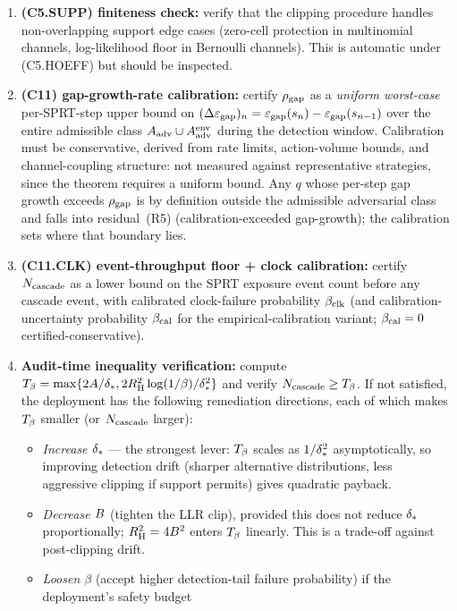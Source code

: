 \begin{enumerate}
  as the certified value.
\item \textbf{(C5.SUPP) finiteness check:} verify that the clipping
  procedure handles non-overlapping support edge cases (zero-cell
  protection in multinomial channels, log-likelihood floor in
  Bernoulli channels).  This is automatic under (C5.HOEFF) but
  should be inspected.
\item \textbf{(C11) gap-growth-rate calibration:} certify $\rho_{\mathrm{gap}}$ as a
    \emph{uniform worst-case} per-SPRT-step upper bound on $(\Delta\varepsilon_{\mathrm{gap}})_n =
    \varepsilon_{\mathrm{gap}}(s_n) - \varepsilon_{\mathrm{gap}}(s_{n-1})$ over the entire admissible class
    $A_{\mathrm{adv}} \cup A_{\mathrm{adv}}^{\mathrm{env}}$ during the detection window.
    Calibration must be conservative, derived from rate limits,
    action-volume bounds, and channel-coupling structure: not measured
    against representative strategies, since the theorem requires a uniform
    bound.  Any $q$ whose per-step gap growth exceeds $\rho_{\mathrm{gap}}$ is by
    definition outside the admissible adversarial class and falls into
    residual~(R5) (calibration-exceeded gap-growth); the calibration sets
    where that boundary lies.
\item \textbf{(C11.CLK) event-throughput floor + clock calibration:}
  certify $N_{\mathrm{cascade}}$ as a lower bound on the SPRT exposure event
  count before any cascade event, with calibrated clock-failure
  probability $\beta_{\mathrm{clk}}$ (and calibration-uncertainty probability
  $\beta_{\mathrm{cal}}$ for the empirical-calibration variant; $\beta_{\mathrm{cal}} = 0$
  certified-conservative).
\item \textbf{Audit-time inequality verification:} compute $T_{\beta}
  = \max\{2A/\delta_{*}, 2R_{\mathrm{H}}^2 \log(1/\beta)/\delta_{*}^2\}$ and
  verify $N_{\mathrm{cascade}} \geq T_{\beta}$.  If not satisfied, the deployment
  has the following remediation directions, each of which makes
  $T_{\beta}$ smaller (or $N_{\mathrm{cascade}}$ larger):
  \begin{itemize}
  \item \emph{Increase $\delta_{*}$} — the strongest lever:
    $T_{\beta}$ scales as $1/\delta_{*}^2$ asymptotically, so improving
    detection drift (sharper alternative distributions, less
    aggressive clipping if support permits) gives quadratic
    payback.
  \item \emph{Decrease $B$} (tighten the LLR clip), provided
    this does not reduce $\delta_{*}$ proportionally; $R_{\mathrm{H}}^2 =
    4B^2$ enters $T_{\beta}$ linearly.  This is a trade-off
    against post-clipping drift.
  \item \emph{Loosen $\beta$} (accept higher detection-tail
    failure probability) if the deployment's safety budget

\end{itemize}
\end{enumerate}
